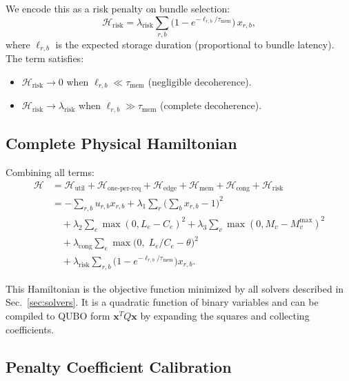 \documentclass[10pt,a4paper]{article}
\newcommand{\calH}{\mathcal{H}}
\begin{document}
We encode this as a risk penalty on bundle selection:
\begin{equation}
  \calH_{\text{risk}} = \lambda_{\text{risk}} \sum_{r,b}
    \bigl(1 - e^{-\ell_{r,b}/\tau_{\text{mem}}}\bigr) \, x_{r,b},
\label{eq:risk}
\end{equation}
where $\ell_{r,b}$ is the expected storage duration (proportional to
bundle latency).  The term satisfies:
\begin{itemize}
  \item $\calH_{\text{risk}} \to 0$ when $\ell_{r,b} \ll \tau_{\text{mem}}$
    (negligible decoherence).
  \item $\calH_{\text{risk}} \to \lambda_{\text{risk}}$ when
    $\ell_{r,b} \gg \tau_{\text{mem}}$ (complete decoherence).
\end{itemize}

\subsection{Complete Physical Hamiltonian}
\label{sec:complete-ham}

Combining all terms:
\begin{align}
  \calH &= \calH_{\text{util}} + \calH_{\text{one-per-req}}
    + \calH_{\text{edge}} + \calH_{\text{mem}}
    + \calH_{\text{cong}} + \calH_{\text{risk}} \nonumber\\
    &= -\sum_{r,b} u_{r,b} x_{r,b}
    + \lambda_1 \sum_r \bigl(\textstyle\sum_b x_{r,b} - 1\bigr)^2 \nonumber\\
    &\quad + \lambda_2 \sum_e \max(0, L_e - C_e)^2
    + \lambda_3 \sum_v \max(0, M_v - M_v^{\max})^2 \nonumber\\
    &\quad + \lambda_{\text{cong}} \sum_e
      \max\!\bigl(0,\; L_e/C_e - \theta\bigr)^2 \nonumber\\
    &\quad + \lambda_{\text{risk}} \sum_{r,b}
      \bigl(1 - e^{-\ell_{r,b}/\tau_{\text{mem}}}\bigr) x_{r,b}.
\label{eq:complete-hamiltonian}
\end{align}

This Hamiltonian is the objective function minimized by all solvers
described in Sec.~\ref{sec:solvers}.  It is a quadratic
function of binary variables and can be compiled to QUBO form
$\mathbf{x}^T Q \mathbf{x}$ by expanding the squares and collecting
coefficients.

\subsection{Penalty Coefficient Calibration}
\label{sec:calibration}
\end{document}
